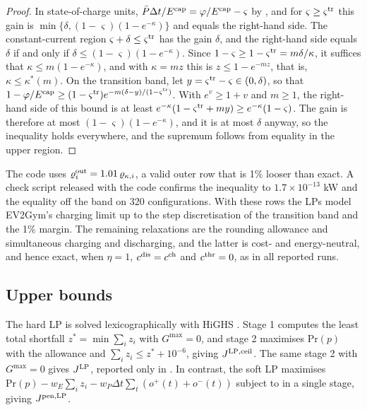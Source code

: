 \begin{proof}
In state-of-charge units, $\bar P\Delta t/E^{\mathrm{cap}}=\varphi/E^{\mathrm{cap}}-\varsigma$ by , and for $\varsigma\ge\varsigma^{\mathrm{tr}}$ this gain is $\min\{\delta,(1-\varsigma)(1-e^{-\kappa})\}$ and equals the right-hand side.
The constant-current region $\varsigma+\delta\le\varsigma^{\mathrm{tr}}$ has the gain $\delta$, and the right-hand side equals $\delta$ if and only if $\delta\le(1-\varsigma)(1-e^{-\kappa})$.
Since $1-\varsigma\ge1-\varsigma^{\mathrm{tr}}=m\delta/\kappa$, it suffices that $\kappa\le m(1-e^{-\kappa})$, and with $\kappa=mz$ this is $z\le1-e^{-mz}$, that is, $\kappa\le\kappa^{*}(m)$.
On the transition band, let $y=\varsigma^{\mathrm{tr}}-\varsigma\in(0,\delta)$, so that $1-\varphi/E^{\mathrm{cap}}\ge(1-\varsigma^{\mathrm{tr}})e^{-m(\delta-y)/(1-\varsigma^{\mathrm{tr}})}$.
With $e^{v}\ge1+v$ and $m\ge1$, the right-hand side of this bound is at least $e^{-\kappa}(1-\varsigma^{\mathrm{tr}}+my)\ge e^{-\kappa}(1-\varsigma)$.
The gain is therefore at most $(1-\varsigma)(1-e^{-\kappa})$, and it is at most $\delta$ anyway, so the inequality holds everywhere, and the supremum follows from equality in the upper region.
\end{proof}

The code uses $\varrho_i^{\mathrm{out}}=1.01\,\varrho_{\kappa,i}$, a valid outer row that is 1\% looser than exact.
A check script released with the code confirms the inequality to $1.7\times10^{-13}$ kW and the equality off the band on 320 configurations.
With these rows the LPs model EV2Gym's charging limit up to the step discretisation of the transition band and the 1\% margin.
The remaining relaxations are the rounding allowance and simultaneous charging and discharging, and the latter is cost- and energy-neutral, and hence exact, when $\eta=1$, $c^{\mathrm{dis}}=c^{\mathrm{ch}}$ and $c^{\mathrm{thr}}=0$, as in all reported runs.

\subsection{Upper bounds}\label{app:bounds}

The hard LP is solved lexicographically with HiGHS \cite{huangfu2018parallelizing}.
Stage 1 computes the least total shortfall $z^{*}=\min\sum_iz_i$ with $G^{\max}=0$, and stage 2 maximises $\mathrm{Pr}(p)$ with the allowance and $\sum_iz_i\le z^{*}+10^{-6}$, giving $J^{\mathrm{LP,ceil}}$.
The same stage 2 with $G^{\max}=0$ gives $J^{\mathrm{LP}}$, reported only in .
In contrast, the soft LP maximises $\mathrm{Pr}(p)-w_E\sum_iz_i-w_P\Delta t\sum_t(o^{+}(t)+o^{-}(t))$ subject to  in a single stage, giving $J^{\mathrm{pen,LP}}$.

